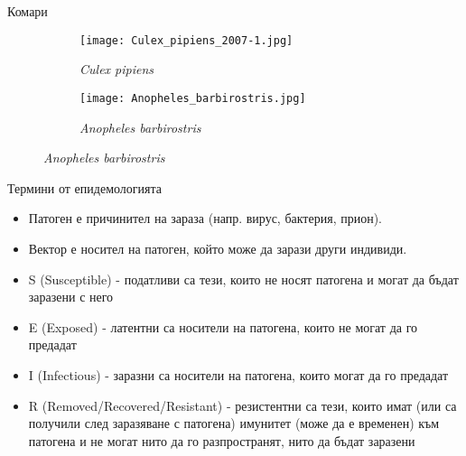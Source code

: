 \section{}
\begin{frame}[t]{Комари}
  \begin{figure}[h]
    \centering
    \begin{subfigure}{0.5\textwidth}
      \centering
      \texttt{[image: Culex\_pipiens\_2007-1.jpg]}
      \caption{\textit{Culex pipiens}}
      \label{fig:Culex}
    \end{subfigure}%
    \begin{subfigure}{0.5\textwidth}
      \centering
      \texttt{[image: Anopheles\_barbirostris.jpg]}
      \caption{\textit{Anopheles barbirostris}}
      \label{fig:Anopheles}
    \end{subfigure}
  \end{figure}
\end{frame}

\begin{frame}[t]{Термини от епидемологията}
  \begin{itemize}
    \item Патоген е причинител на зараза (напр. вирус, бактерия, прион).
    \item Вектор е носител на патоген, който може да зарази други индивиди.
    \item S (Susceptible) - податливи са тези, които не носят патогена и могат да бъдат заразени с него
    \item E (Exposed) - латентни са носители на патогена, които не могат да го предадат
    \item I (Infectious) - заразни са носители на патогена, които могат да го предадат
    \item R (Removed/Recovered/Resistant) - резистентни са тези, които имат (или са получили след заразяване с патогена) имунитет (може да е временен) към патогена и не могат нито да го разпространят, нито да бъдат заразени
  \end{itemize}
\end{frame}

